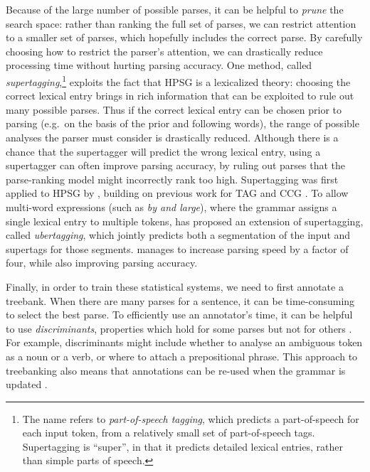 \documentclass[output=paper,nonflat]{langsci/langscibook}
\begin{document}
Because of the large number of possible parses,
it can be helpful to \textit{prune} the search space:
rather than ranking the full set of parses,
we can restrict attention to a smaller set of parses,
which hopefully includes the correct parse.
By carefully choosing how to restrict the parser's attention,
we can drastically reduce processing time without hurting parsing accuracy.
One method, called \textit{supertagging},\footnote{%
	The name refers to \textit{part-of-speech tagging},
	which predicts a part-of-speech for each input token,
	from a relatively small set of part-of-speech tags.
	Supertagging is ``super'', in that it predicts detailed lexical entries,
	rather than simple parts of speech.
}
exploits the fact that HPSG is a lexicalized theory:
choosing the correct lexical entry brings in rich information
that can be exploited to rule out many possible parses.
Thus if the correct lexical entry can be chosen prior to parsing
(e.g.\ on the basis of the prior and following words),
the range of possible analyses the parser must consider is drastically reduced.
Although there is a chance that the supertagger will predict the wrong lexical entry,
using a supertagger can often improve parsing accuracy,
by ruling out parses that the parse-ranking model might incorrectly rank too high.
Supertagging was first applied to HPSG by \citet{matsuzaki2007supertag},
building on previous work for TAG \citep{bangalore1999supertag}
and CCG \citep{clark2004supertag}.
To allow multi-word expressions (such as \textit{by and large}),
where the grammar assigns a single lexical entry to multiple tokens,
\citet{dridan2013ubertag} has proposed an extension of supertagging, called \textit{ubertagging},
which jointly predicts both a segmentation of the input and supertags for those segments.
\citeauthor{dridan2013ubertag} manages to increase parsing speed by a factor of four,
while also improving parsing accuracy.


Finally, in order to train these statistical systems,
we need to first annotate a treebank.
When there are many parses for a sentence,
it can be time-consuming to select the best parse.
To efficiently use an annotator's time,
it can be helpful to use \textit{discriminants},
properties which hold for some parses but not for others \citep{Carter:97}.
For example, discriminants might include
whether to analyse an ambiguous token as a noun or a verb,
or where to attach a prepositional phrase.
This approach to treebanking also means that
annotations can be re-used when the grammar is updated
\citep{OFTM2004a-u,Fli:Oep:Ben:17}.
\end{document}
